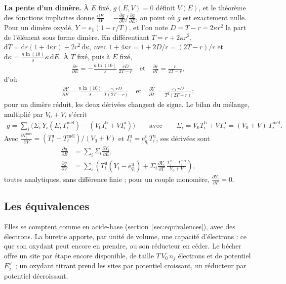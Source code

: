 \documentclass[a4paper,11pt]{article}
\newcommand\gras[1]{\textbf{#1}}
\newcommand\ddp[2]{\frac{\mathrm{d}#1}{\mathrm{d}#2}}
\newcommand\pdp[2]{\frac{\partial#1}{\partial#2}}
\newcommand\pare[1]{\left(#1\right)}
\newcommand\et{\quad\text{et}\quad}
\begin{document}
\gras{La pente d'un dimère.} À $E$ fixé, $g(E,V)=0$ définit $V(E)$, et le théorème des fonctions implicites donne $\ddp EV=-\pdp gV\big/\pdp gE$, au point où $g$ est exactement nulle.
Pour un dimère oxydé, $Y=e_1\pare{1-r/T}$, et l'on note $D=T-r=2\kappa r^2$ la part de l'élément sous forme dimère.
En différentiant $T=r+2\kappa r^2$, $\mathrm dT=\mathrm dr\pare{1+4\kappa r}+2r^2\,\mathrm d\kappa$, avec $1+4\kappa r=1+2D/r=(2T-r)/r$ et $\mathrm d\kappa=\frac{n\ln(10)}s\kappa\,\mathrm dE$.
À $T$ fixé, puis à $E$ fixé,
\begin{align}
\pdp rE=-\frac{n\ln(10)}s\,\frac{rD}{2T-r}
\et
\pdp rT=\frac r{2T-r},
\end{align}
d'où
\begin{align}
\pdp YE=\frac{n\ln(10)}s\,\frac{e_1\,rD}{T(2T-r)}
\et
\pdp YT=\frac{e_1\,rD}{T^2(2T-r)} ;
\end{align}
pour un dimère réduit, les deux dérivées changent de signe.
Le bilan du mélange, multiplié par $V_0+V$, s'écrit
\begin{align}
g=\sum_i\Big(\Sigma_i\,Y_i\pare{E,T_i^\text{mél}}-\pare{V_0I_i^\text{b}+VI_i^\text{u}}\Big)
\qquad\text{avec}\qquad\Sigma_i=V_0T^\text{b}_i+VT^\text{u}_i=(V_0+V)\,T_i^\text{mél}.
\end{align}
Avec $\pdp{T_i^\text{mél}}V=\pare{T^\text{u}_i-T^\text{mél}_i}/(V_0+V)$ et $I^\text{u}_i=e^\text{u}_{q_i}T^\text{u}_i$, ses dérivées sont
\begin{align}
\pdp gE&=\sum_i\Sigma_i\pdp{Y_i}E,\\
\pdp gV&=\sum_i\pare{T^\text{u}_i\pare{Y_i-e_{q_i}^\text{u}}+\Sigma_i\pdp{Y_i}T\,\frac{T^\text{u}_i-T^\text{mél}_i}{V_0+V}},
\end{align}
toutes analytiques, sans différence finie ; pour un couple monomère, $\pdp{Y_i}T=0$.

\subsection{Les équivalences}
Elles se comptent comme en acide-base (section~\ref{sec:equivalences}), avec des électrons.
La burette apporte, par unité de volume, une capacité d'électrons : ce que son oxydant peut encore en prendre, ou son réducteur en céder.
Le bécher offre un site par étape encore disponible, de taille $T\,V_0\,n_j$ électrons et de potentiel $E^{\circ\prime}_j$ ; un oxydant titrant prend les sites par potentiel croissant, un réducteur par potentiel décroissant.
\end{document}

